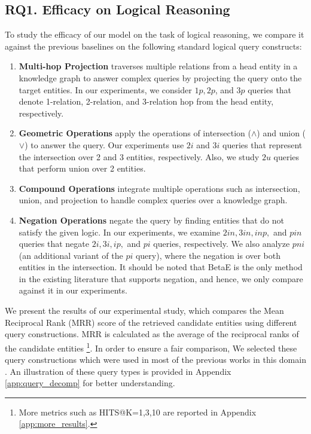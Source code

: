 \documentclass{article} %
\begin{document}
\subsection{RQ1. Efficacy on Logical Reasoning}
\label{sec:logical_reasoning}
To study the efficacy of our model on the task of logical reasoning, we compare it against the previous baselines on the following standard logical query constructs:
\begin{enumerate}[noitemsep,leftmargin=*]
    \item \textbf{Multi-hop Projection} traverses multiple relations from a head entity in a knowledge graph to answer complex queries by projecting the query onto the target entities. In our experiments, we consider $1p, 2p$, and $3p$ queries that denote 1-relation, 2-relation, and 3-relation hop from the head entity, respectively.
    \item \textbf{Geometric Operations} apply the operations of intersection ($\wedge$) and union ($\vee$) to answer the query. Our experiments use $2i$ and $3i$ queries that represent the intersection over 2 and 3 entities, respectively. Also, we study $2u$ queries that perform union over 2 entities. 
    \item \textbf{Compound Operations} integrate multiple operations such as intersection, union, and projection to handle complex queries over a knowledge graph.
    \item \textbf{Negation Operations} negate the query by finding entities that do not satisfy the given logic. In our experiments, we examine $2in, 3in, inp,$ and $pin$ queries that negate $2i, 3i, ip,$ and $pi$ queries, respectively. We also analyze $pni$ (an additional variant of the $pi$ query), where the negation is over both entities in the intersection. It should be noted that BetaE is the only method in the existing literature that supports negation, and hence, we only compare against it in our experiments.
\end{enumerate}
We present the results of our experimental study, which compares the Mean Reciprocal Rank (MRR) score of the retrieved candidate entities using different query constructions. MRR is calculated as the average of the reciprocal ranks of the candidate entities \footnote{More metrics such as HITS@K=1,3,10 are reported in Appendix \ref{app:more_results}.}. In order to ensure a fair comparison, We selected these query constructions which were used in most of the previous works in this domain \citep{ren2020beta}. An illustration of these query types is provided in Appendix \ref{app:query_decomp} for better understanding.
\end{document}
